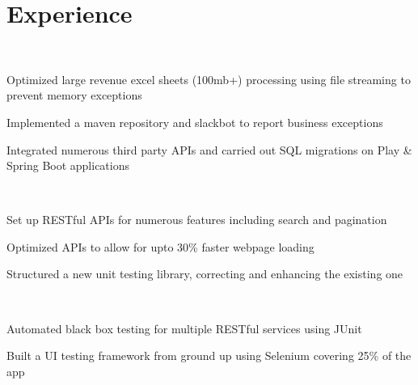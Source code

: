 \documentclass[]{hieudo-build}
\begin{document}
\begin{minipage}[t]{0.65\textwidth} 

\section{Experience}

\\
\color{myyellow}
\vspace{0.9em} %
\begin{tightemize}
\item Optimized large revenue excel sheets (100mb+) processing using file streaming to prevent memory exceptions
\item Implemented a maven repository and slackbot to report business exceptions
\item Integrated numerous third party APIs and carried out SQL migrations on Play \& Spring Boot applications
\end{tightemize}
\sectionsep

 \\
\begin{tightemize}
\item Set up RESTful APIs for numerous features including search and pagination 
\item Optimized APIs to allow for upto 30\% faster webpage loading
\item  Structured a new unit testing library, correcting and enhancing the existing one
\end{tightemize}
\sectionsep

 \\
\begin{tightemize}
\item Automated black box testing for multiple RESTful services using JUnit
\item Built a UI testing framework from ground up using Selenium covering 25\% of the app
\end{tightemize}
\sectionsep


\end{minipage}
\end{document}
